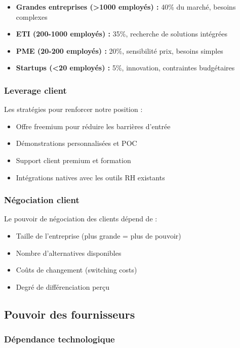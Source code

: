 \documentclass[12pt,a4paper]{report}
\begin{document}
\begin{itemize}
\item \textbf{Grandes entreprises (>1000 employés) :} 40\% du marché, besoins complexes
\item \textbf{ETI (200-1000 employés) :} 35\%, recherche de solutions intégrées
\item \textbf{PME (20-200 employés) :} 20\%, sensibilité prix, besoins simples
\item \textbf{Startups (<20 employés) :} 5\%, innovation, contraintes budgétaires
\end{itemize}

\subsubsection{Leverage client}

Les stratégies pour renforcer notre position :
\begin{itemize}
\item Offre freemium pour réduire les barrières d'entrée
\item Démonstrations personnalisées et POC
\item Support client premium et formation
\item Intégrations natives avec les outils RH existants
\end{itemize}

\subsubsection{Négociation client}

Le pouvoir de négociation des clients dépend de :
\begin{itemize}
\item Taille de l'entreprise (plus grande = plus de pouvoir)
\item Nombre d'alternatives disponibles
\item Coûts de changement (switching costs)
\item Degré de différenciation perçu
\end{itemize}

\subsection{Pouvoir des fournisseurs}

\subsubsection{Dépendance technologique}
\end{document}
